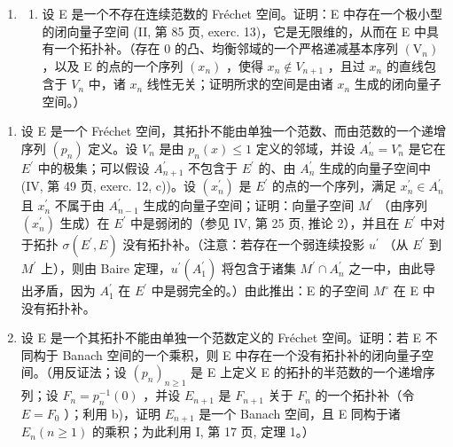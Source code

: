 \begin{enumerate}
\def\labelenumi{\arabic{enumi})}
\setcounter{enumi}{13}
\tightlist
\item
  \begin{enumerate}
  \def\labelenumii{\alph{enumii})}
  \tightlist
  \item
    设 E 是一个不存在连续范数的 Fréchet 空间。证明：E 中存在一个极小型的闭向量子空间 (II, 第 85 页, exerc. 13)，它是无限维的，从而在 E 中具有一个拓扑补。（存在 0 的凸、均衡邻域的一个严格递减基本序列 \((\mathrm{V}_{n})\) ，以及 E 的点的一个序列 \((x_{n})\) ，使得 \(x_{n} \notin V_{n+1}\) ，且过 \(x_{n}\) 的直线包含于 \(V_{n}\) 中，诸 \(x_{n}\) 线性无关；证明所求的空间是由诸 \(x_{n}\) 生成的闭向量子空间。）
  \end{enumerate}
\end{enumerate}

\begin{enumerate}
\def\labelenumi{\alph{enumi})}
\setcounter{enumi}{1}
\item
  设 E 是一个 Fréchet 空间，其拓扑不能由单独一个范数、而由范数的一个递增序列 \((p_{n})\) 定义。设 \(V_{n}\) 是由 \(p_{n}(x) \leqslant 1\) 定义的邻域，并设 \(A_{n}^{\prime} = V_{n}^{\circ}\) 是它在 \(E^{\prime}\) 中的极集；可以假设 \(A_{n+1}^{\prime}\) 不包含于 \(E^{\prime}\) 的、由 \(A_{n}^{\prime}\) 生成的向量子空间中 (IV, 第 49 页, exerc. 12, c))。设 \((x_{n}^{\prime})\) 是 \(E^{\prime}\) 的点的一个序列，满足 \(x_{n}^{\prime} \in A_{n}^{\prime}\) 且 \(x_{n}^{\prime}\) 不属于由 \(A_{n-1}^{\prime}\) 生成的向量子空间；证明：向量子空间 \(M^{\prime}\) （由序列 \((x_{n}^{\prime})\) 生成）在 \(E^{\prime}\) 中是弱闭的（参见 IV, 第 25 页, 推论 2），并且在 \(E^{\prime}\) 中对于拓扑 \(\sigma(E^{\prime}, E)\) 没有拓扑补。（注意：若存在一个弱连续投影 \(u^{\prime}\) （从 \(E^{\prime}\) 到 \(M^{\prime}\) 上），则由 Baire 定理，\(u^{\prime}(A_{1}^{\prime})\) 将包含于诸集 \(M^{\prime} \cap A_{n}^{\prime}\) 之一中，由此导出矛盾，因为 \(A_{1}^{\prime}\) 在 \(E^{\prime}\) 中是弱完全的。）由此推出：E 的子空间 \(M^{\circ}\) 在 E 中没有拓扑补。
\item
  设 E 是一个其拓扑不能由单独一个范数定义的 Fréchet 空间。证明：若 E 不同构于 Banach 空间的一个乘积，则 E 中存在一个没有拓扑补的闭向量子空间。（用反证法；设 \((p_{n})_{n\geqslant1}\) 是 E 上定义 E 的拓扑的半范数的一个递增序列；设 \(F_{n}=p_{n}^{-1}(0)\) ，并设 \(E_{n+1}\) 是 \(F_{n+1}\) 关于 \(F_{n}\) 的一个拓扑补（令 \(E=F_{0}\) ）；利用 b)，证明 \(E_{n+1}\) 是一个 Banach 空间，且 E 同构于诸 \(E_{n}(n\geqslant1)\) 的乘积；为此利用 I, 第 17 页, 定理 1。）
\end{enumerate}

